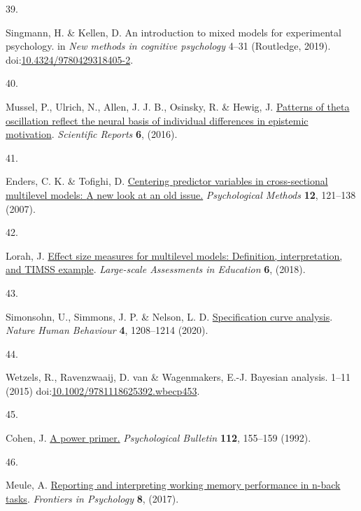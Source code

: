 \documentclass[
  man,floatsintext]{apa6}
\newlength{\cslhangindent}
\newlength{\csllabelwidth}
\newlength{\cslentryspacingunit} %
\newenvironment{CSLReferences}[2] %
 {%
  \setlength{\parindent}{0pt}
  \ifodd #1
  \let\oldpar\par
  \def\par{\hangindent=\cslhangindent\oldpar}
  \fi
  \setlength{\parskip}{#2\cslentryspacingunit}
 }%
 {}
\newcommand{\CSLLeftMargin}[1]{\parbox[t]{\csllabelwidth}{#1}}
\newcommand{\CSLRightInline}[1]{\parbox[t]{\linewidth - \csllabelwidth}{#1}\break}
\begin{document}
\begin{CSLReferences}{0}{0}
\leavevmode{}%
\CSLLeftMargin{39. }%
\CSLRightInline{Singmann, H. \& Kellen, D. An introduction to mixed models for experimental psychology. in \emph{New methods in cognitive psychology} 4--31 (Routledge, 2019). doi:\href{https://doi.org/10.4324/9780429318405-2}{10.4324/9780429318405-2}.}

\leavevmode{}%
\CSLLeftMargin{40. }%
\CSLRightInline{Mussel, P., Ulrich, N., Allen, J. J. B., Osinsky, R. \& Hewig, J. \href{https://doi.org/10.1038/srep29245}{Patterns of theta oscillation reflect the neural basis of individual differences in epistemic motivation}. \emph{Scientific Reports} \textbf{6}, (2016).}

\leavevmode{}%
\CSLLeftMargin{41. }%
\CSLRightInline{Enders, C. K. \& Tofighi, D. \href{https://doi.org/10.1037/1082-989x.12.2.121}{Centering predictor variables in cross-sectional multilevel models: {A} new look at an old issue.} \emph{Psychological Methods} \textbf{12}, 121--138 (2007).}

\leavevmode{}%
\CSLLeftMargin{42. }%
\CSLRightInline{Lorah, J. \href{https://doi.org/10.1186/s40536-018-0061-2}{Effect size measures for multilevel models: Definition, interpretation, and {TIMSS} example}. \emph{Large-scale Assessments in Education} \textbf{6}, (2018).}

\leavevmode{}%
\CSLLeftMargin{43. }%
\CSLRightInline{Simonsohn, U., Simmons, J. P. \& Nelson, L. D. \href{https://doi.org/10.1038/s41562-020-0912-z}{Specification curve analysis}. \emph{Nature Human Behaviour} \textbf{4}, 1208--1214 (2020).}

\leavevmode{}%
\CSLLeftMargin{44. }%
\CSLRightInline{Wetzels, R., Ravenzwaaij, D. van \& Wagenmakers, E.-J. Bayesian analysis. 1--11 (2015) doi:\href{https://doi.org/10.1002/9781118625392.wbecp453}{10.1002/9781118625392.wbecp453}.}

\leavevmode{}%
\CSLLeftMargin{45. }%
\CSLRightInline{Cohen, J. \href{https://doi.org/10.1037/0033-2909.112.1.155}{A power primer.} \emph{Psychological Bulletin} \textbf{112}, 155--159 (1992).}

\leavevmode{}%
\CSLLeftMargin{46. }%
\CSLRightInline{Meule, A. \href{https://doi.org/10.3389/fpsyg.2017.00352}{Reporting and interpreting working memory performance in n-back tasks}. \emph{Frontiers in Psychology} \textbf{8}, (2017).}


\end{CSLReferences}
\end{document}
